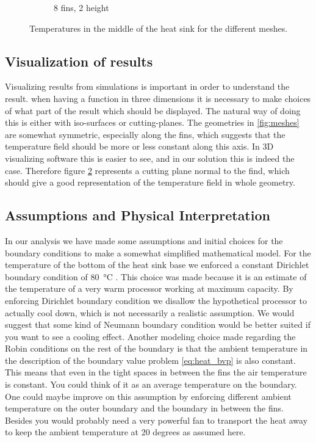 \begin{figure}[h]
\begin{subfigure}[t] {0.23\textwidth}
 \caption{8 fins, 2 height}
 \label{fig:mesh_temps_res_8_2}
 \end{subfigure}
 \caption{Temperatures in the middle of the heat sink for the different meshes.}
 \label{fig:mesh_temps}
 \end{figure}
 
\subsection{Visualization of results}
Visualizing results from simulations is important in order to understand the result. when having a function in three dimensions it is necessary to make choices of what part of the result which should be displayed. The natural way of doing this is either with iso-surfaces or cutting-planes. The geometries in \ref{fig:meshes} are somewhat symmetric, especially along the fins, which suggests that the temperature field should be more or less constant along this axis. In 3D visualizing software this is easier to see, and in our solution this is indeed the case. Therefore figure \ref{fig:mesh_temps} represents a cutting plane normal to the find, which should give a good representation of the temperature field in whole geometry.

\subsection{Assumptions and Physical Interpretation}
In our analysis we have made some assumptions and initial choices for the boundary conditions to make a somewhat simplified mathematical model. For the temperature of the bottom of the heat sink base we enforced a constant Dirichlet boundary condition of \SI{80}{\celsius} . This choice was made because it is an estimate of the temperature of a very warm processor working at maximum capacity. By enforcing Dirichlet boundary condition we disallow the hypothetical processor to actually cool down, which is not necessarily a realistic assumption. We would suggest that some kind of Neumann boundary condition would be better suited if you want to see a cooling effect. Another modeling choice made regarding the Robin conditions on the rest of the boundary is that the ambient temperature in the description of the boundary value problem \eqref{eq:heat_bvp} is also constant. This means that even in the tight spaces in between the fins the air temperature is constant. You could think of it as an average temperature on the boundary. One could maybe improve on this assumption by enforcing different ambient temperature on the outer boundary and the boundary in between the fins. Besides you would probably need a very powerful fan to transport the heat away to keep the ambient temperature at 20 degrees as assumed here. 

